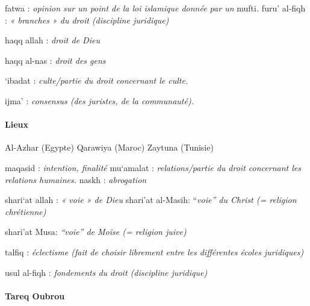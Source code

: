 fatwa : \emph{opinion sur un point de la loi islamique donnée par un}
mufti\emph{.} furu' al-fiqh : \emph{« branches » du droit (discipline
juridique)}

haqq allah : \emph{droit de Dieu}

haqq al-nas : \emph{droit des gens}

`ibadat : \emph{culte/partie du droit concernant le culte.}

ijma' : \emph{consensus (des juristes, de la communauté).}

\paragraph{Lieux}

Al-Azhar (Egypte) Qarawiya (Maroc) Zaytuna (Tunisie)

maqasid : \emph{intention, finalité} mu`amalat : \emph{relations/partie
du droit concernant les relations humaines.} naskh : \emph{abrogation}

shari`at allah : \emph{« voie » de Dieu} shari'at al-Masih:
``\emph{voie'' du Christ (= religion chrétienne)}

shari'at Musa: \emph{``voie'' de Moïse (= religion juive)}

talfiq : \emph{éclectisme (fait de choisir librement entre les
différentes écoles juridiques)}

usul al-fiqh : \emph{fondements du droit (discipline juridique)}

\paragraph{Tareq Oubrou} \label{tareq-oubrou}


